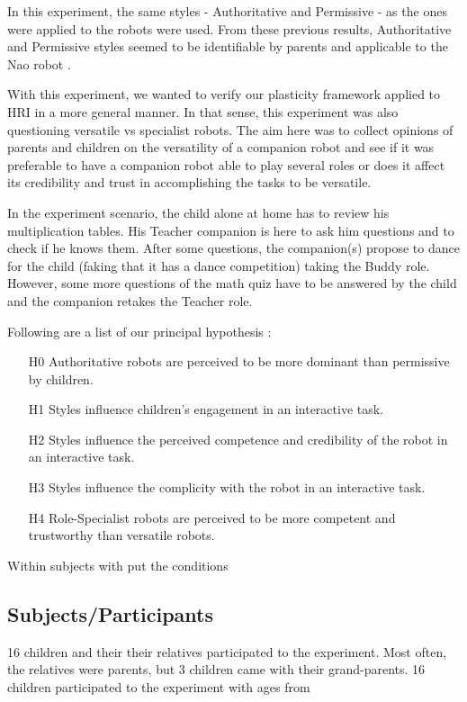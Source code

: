 \documentclass[a4paper,twocolumn]{svjour3}
\begin{document}
In this experiment, the same styles - Authoritative and Permissive -  as the ones were applied to the robots were used.
From these previous results, Authoritative and Permissive styles seemed to be identifiable by parents and applicable to the Nao robot \cite{Johal2014}. 

With this experiment, we wanted to verify our plasticity framework applied to HRI in a more general manner. 
In that sense, this experiment was also questioning versatile vs specialist robots. 
The aim here was to collect opinions of parents and children on the versatility of a companion robot and see if it was preferable to have a companion robot able to play several roles or does it affect its credibility and trust in accomplishing the tasks to be versatile.

In the experiment scenario, the child alone at home has to review his multiplication tables. 
His Teacher companion is here to ask him questions and to check if he knows them. 
After some questions, the companion(s) propose to dance for the child (faking that it has a dance competition) taking the Buddy role. 
However, some more questions of the math quiz have to be answered by the child and the companion retakes the Teacher role.


Following are a list of our principal hypothesis :
\begin{itemize}[noitemsep,nolistsep]
	\item[H0] Authoritative robots are perceived to be more dominant than permissive by children.
	\item[H1] Styles influence children's engagement in an interactive task.
	\item[H2] Styles influence the perceived competence and credibility of the robot in an interactive task.
	\item[H3] Styles influence the complicity with the robot in an interactive task.
	\item[H4] Role-Specialist robots are perceived to be more competent and trustworthy than versatile robots.
\end{itemize}
Within subjects with put the conditions
\subsection{Subjects/Participants}
16 children and their their relatives participated to the experiment. 
Most often, the relatives were parents, but 3 children came with their grand-parents.
16 children participated to the experiment with ages from  
\end{document}
